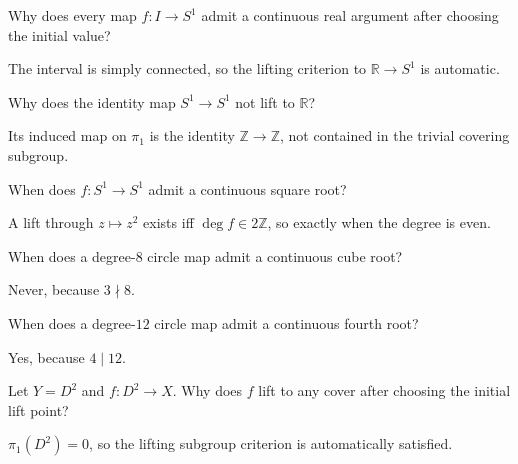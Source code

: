 \begin{problem}\label{prob:viii11-08}
Why does every map \(f:I\to S^1\) admit a continuous real argument after choosing the initial value?
\end{problem}
\begin{solution}
The interval is simply connected, so the lifting criterion to \(\mathbb R\to S^1\) is automatic.
\end{solution}

\begin{problem}\label{prob:viii11-09}
Why does the identity map \(S^1\to S^1\) not lift to \(\mathbb R\)?
\end{problem}
\begin{solution}
Its induced map on \(\pi_1\) is the identity \(\mathbb Z\to\mathbb Z\), not contained in the trivial covering subgroup.
\end{solution}

\begin{problem}\label{prob:viii11-10}
When does \(f:S^1\to S^1\) admit a continuous square root?
\end{problem}
\begin{solution}
A lift through \(z\mapsto z^2\) exists iff \(\deg f\in2\mathbb Z\), so exactly when the degree is even.
\end{solution}

\begin{problem}\label{prob:viii11-11}
When does a degree-\(8\) circle map admit a continuous cube root?
\end{problem}
\begin{solution}
Never, because \(3\nmid8\).
\end{solution}

\begin{problem}\label{prob:viii11-12}
When does a degree-\(12\) circle map admit a continuous fourth root?
\end{problem}
\begin{solution}
Yes, because \(4\mid12\).
\end{solution}

\begin{problem}\label{prob:viii11-13}
Let \(Y=D^2\) and \(f:D^2\to X\). Why does \(f\) lift to any cover after choosing the initial lift point?
\end{problem}
\begin{solution}
\(\pi_1(D^2)=0\), so the lifting subgroup criterion is automatically satisfied.
\end{solution}

